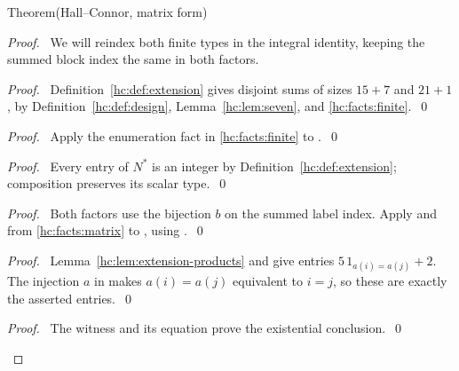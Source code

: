 \begin{mergedproofsection}
\begin{namedresult}{Theorem}{(Hall--Connor, matrix form)}\label{hc:thm:matrix}
 \leavevmode\par
\end{namedresult}
\begin{proof}
 \pfsketch\ We will reindex both finite types in the integral
 identity, keeping the summed block index the same in both factors.
 \begin{proof}\pf\ Definition~\ref{hc:def:extension} gives disjoint
  sums of sizes $15+7$ and $21+1$, by
  Definition~\ref{hc:def:design}, Lemma~\ref{hc:lem:seven}, and
  \ref{hc:facts:finite}.~\qed\end{proof}
 \begin{proof}\pf\ Apply the enumeration fact in
  \ref{hc:facts:finite} to .~\qed\end{proof}
 \begin{proof}\pf\ Every entry of $N^*$ is an integer by
  Definition~\ref{hc:def:extension}; composition preserves its scalar type.~\qed\end{proof}
 \begin{proof}\pf\ Both factors use the bijection $b$ on the
  summed label index. Apply 
  and  from \ref{hc:facts:matrix}
  to , using .~\qed\end{proof}
 \begin{proof}\pf\ Lemma~\ref{hc:lem:extension-products} and
   give entries
  $5\,1_{a(i)=a(j)}+2$. The injection $a$ in
   makes $a(i)=a(j)$ equivalent to $i=j$,
  so these are exactly the asserted entries.~\qed\end{proof}
 \qedstep
 \begin{proof}\pf\ The witness  and its
  equation  prove the existential conclusion.~\qed\end{proof}
\end{proof}


\end{mergedproofsection}
